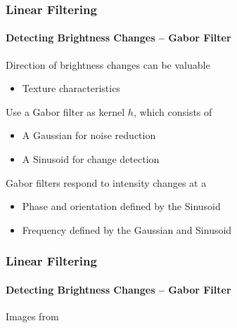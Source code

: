 \documentclass[xetex,professionalfont]{beamer}
\begin{document}

\begin{frame}
\frametitle{Linear Filtering}
\framesubtitle{Detecting Brightness Changes -- Gabor Filter}

Direction of brightness changes can be valuable
\begin{itemize}
    \item Texture characteristics
\end{itemize}

\bigskip
Use a Gabor filter as kernel $h$, which consists of
\begin{itemize}
    \item A Gaussian for noise reduction
    \item A Sinusoid for change detection 
\end{itemize}

\bigskip
Gabor filters respond to intensity changes at a
\begin{itemize}
    \item Phase and orientation defined by the Sinusoid %
    \item Frequency defined by the Gaussian and Sinusoid
\end{itemize}

\end{frame}


\begin{frame}
\frametitle{Linear Filtering}
\framesubtitle{Detecting Brightness Changes -- Gabor Filter}

\begin{center}
    {\centering Images from \cite{prince12}}
\end{center}

\end{frame}
\end{document}
